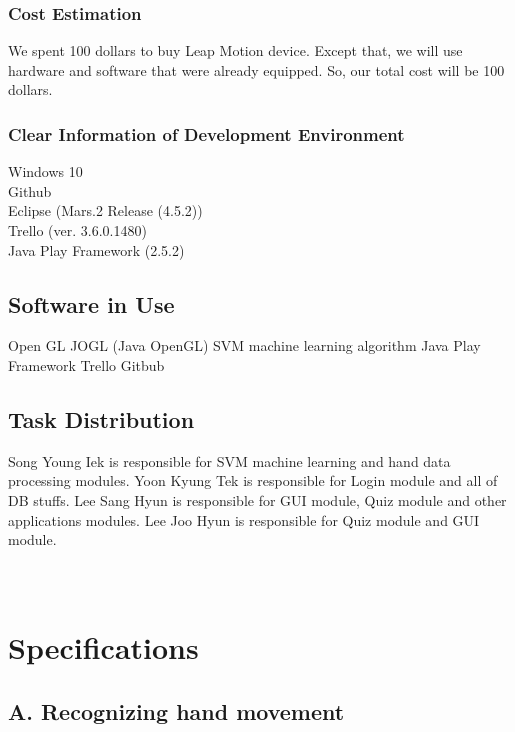 \documentclass[10pt,journal,compsoc]{IEEEtran}
\begin{document}
\subsubsection{Cost Estimation}

We spent 100 dollars to buy Leap Motion device. Except that, we will use hardware and software that were already equipped. So, our total cost will be 100 dollars.

\subsubsection{Clear Information of Development Environment}

Windows 10
\\Github
\\Eclipse (Mars.2 Release (4.5.2))
\\Trello (ver. 3.6.0.1480)
\\Java Play Framework (2.5.2)

\subsection{Software in Use}
Open GL
JOGL (Java OpenGL)
SVM machine learning algorithm
Java Play Framework
Trello
Gitbub


\subsection{Task Distribution}
Song Young Iek is responsible for SVM machine learning and hand data processing modules.
Yoon Kyung Tek is responsible for Login module and all of DB stuffs.
Lee Sang Hyun is responsible for GUI module, Quiz module and other applications modules.
Lee Joo Hyun is responsible for Quiz module and GUI module.\\\\\\

\ifCLASSOPTIONcompsoc
{}
\else
\section{Specifications}
\label{sec:Specifications}
\fi
\subsection{A. Recognizing hand movement}
\end{document}
